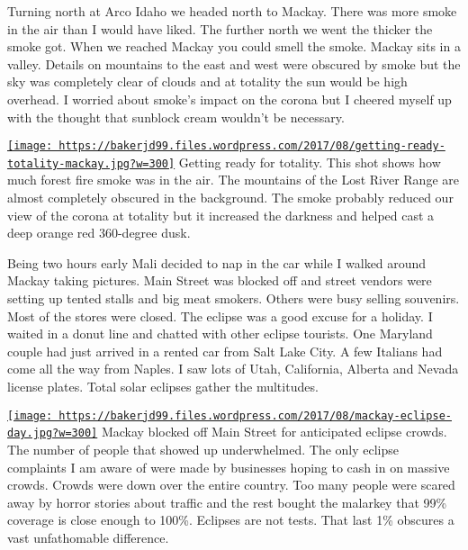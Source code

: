 Turning north at Arco Idaho we headed north to Mackay. There was more
smoke in the air than I would have liked. The further north we went the
thicker the smoke got. When we reached Mackay you could smell the smoke.
Mackay sits in a valley. Details on mountains to the east and west were
obscured by smoke but the sky was completely clear of clouds and at
totality the sun would be high overhead. I worried about smoke's impact
on the corona but I cheered myself up with the thought that sunblock
cream wouldn't be necessary.


\href{https://conceptcontrol.smugmug.com/Places/USA-and-Canada/Idaho-Instants/i-8P2mvsJ/A}{\texttt{[image: https://bakerjd99.files.wordpress.com/2017/08/getting-ready-totality-mackay.jpg?w=300]}}
Getting ready for totality. This shot shows how much forest fire smoke
was in the air. The mountains of the Lost River Range are almost
completely obscured in the background. The smoke probably reduced our
view of the corona at totality but it increased the darkness and helped
cast a deep orange red 360-degree dusk.


Being two hours early Mali decided to nap in the car while I walked
around Mackay taking pictures. Main Street was blocked off and street
vendors were setting up tented stalls and big meat smokers. Others were
busy selling souvenirs. Most of the stores were closed. The eclipse was
a good excuse for a holiday. I waited in a donut line and chatted with
other eclipse tourists. One Maryland couple had just arrived in a rented
car from Salt Lake City. A few Italians had come all the way from
Naples. I saw lots of Utah, California, Alberta and Nevada license
plates. Total solar eclipses gather the multitudes.


\href{https://conceptcontrol.smugmug.com/Places/USA-and-Canada/Idaho-Instants}{\texttt{[image: https://bakerjd99.files.wordpress.com/2017/08/mackay-eclipse-day.jpg?w=300]}}
Mackay blocked off Main Street for anticipated eclipse crowds. The
number of people that showed up underwhelmed. The only eclipse
complaints I am aware of were made by businesses hoping to cash in on
massive crowds. Crowds were down over the entire country. Too many
people were scared away by horror stories about traffic and the rest
bought the malarkey that 99\% coverage is close enough to 100\%.
Eclipses are not tests. That last 1\% obscures a vast unfathomable
difference.


